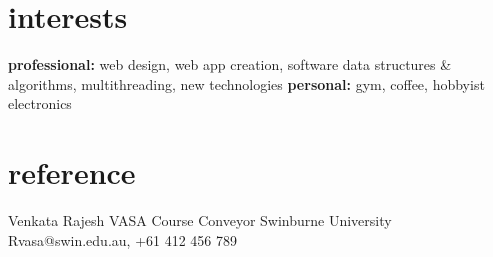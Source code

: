 \documentclass[]{friggeri-cv} %
\begin{document}



\section{interests}

\textbf{professional:} web design, web app creation, software data structures \& algorithms, multithreading, new technologies \textbf{personal:} gym, coffee, hobbyist electronics


\section{reference}

\begin{entrylist}
\entry
{}
{Venkata Rajesh VASA}
{Course Conveyor Swinburne University}
{Rvasa@swin.edu.au, +61 412 456 789}
\end{entrylist}
\end{document}
